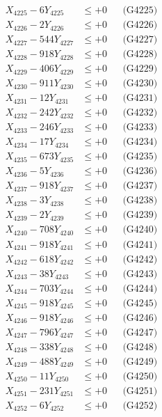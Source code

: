 \documentclass[a4paper,10pt]{article}
\begin{document}
{\begin{align}
X_{4225} - 6Y_{4225} &\leq +0 && \text{(G4225)} \\
X_{4226} - 2Y_{4226} &\leq +0 && \text{(G4226)} \\
X_{4227} - 544Y_{4227} &\leq +0 && \text{(G4227)} \\
X_{4228} - 918Y_{4228} &\leq +0 && \text{(G4228)} \\
X_{4229} - 406Y_{4229} &\leq +0 && \text{(G4229)} \\
X_{4230} - 911Y_{4230} &\leq +0 && \text{(G4230)} \\
\allowbreak
X_{4231} - 12Y_{4231} &\leq +0 && \text{(G4231)} \\
X_{4232} - 242Y_{4232} &\leq +0 && \text{(G4232)} \\
X_{4233} - 246Y_{4233} &\leq +0 && \text{(G4233)} \\
X_{4234} - 17Y_{4234} &\leq +0 && \text{(G4234)} \\
X_{4235} - 673Y_{4235} &\leq +0 && \text{(G4235)} \\
X_{4236} - 5Y_{4236} &\leq +0 && \text{(G4236)} \\
X_{4237} - 918Y_{4237} &\leq +0 && \text{(G4237)} \\
X_{4238} - 3Y_{4238} &\leq +0 && \text{(G4238)} \\
X_{4239} - 2Y_{4239} &\leq +0 && \text{(G4239)} \\
X_{4240} - 708Y_{4240} &\leq +0 && \text{(G4240)} \\
\allowbreak
X_{4241} - 918Y_{4241} &\leq +0 && \text{(G4241)} \\
X_{4242} - 618Y_{4242} &\leq +0 && \text{(G4242)} \\
X_{4243} - 38Y_{4243} &\leq +0 && \text{(G4243)} \\
X_{4244} - 703Y_{4244} &\leq +0 && \text{(G4244)} \\
X_{4245} - 918Y_{4245} &\leq +0 && \text{(G4245)} \\
X_{4246} - 918Y_{4246} &\leq +0 && \text{(G4246)} \\
X_{4247} - 796Y_{4247} &\leq +0 && \text{(G4247)} \\
X_{4248} - 338Y_{4248} &\leq +0 && \text{(G4248)} \\
X_{4249} - 488Y_{4249} &\leq +0 && \text{(G4249)} \\
X_{4250} - 11Y_{4250} &\leq +0 && \text{(G4250)} \\
\allowbreak
X_{4251} - 231Y_{4251} &\leq +0 && \text{(G4251)} \\
X_{4252} - 6Y_{4252} &\leq +0 && \text{(G4252)} \\

\end{align}}
\end{document}
